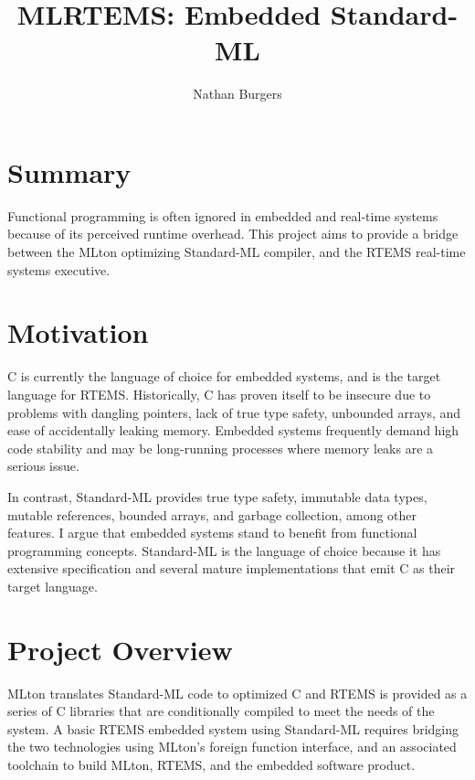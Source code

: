 \documentclass[12pt]{article}
\title{MLRTEMS: Embedded Standard-ML}
\author{Nathan Burgers}
\begin{document}
\maketitle

\section{Summary}
Functional programming is often ignored in embedded and real-time systems because of its perceived runtime overhead. This project aims to provide a bridge between the MLton optimizing Standard-ML compiler, and the RTEMS real-time systems executive.

\section{Motivation}
C is currently the language of choice for embedded systems, and is the target language for RTEMS. Historically, C has proven itself to be insecure due to problems with dangling pointers, lack of true type safety, unbounded arrays, and ease of accidentally leaking memory. Embedded systems frequently demand high code stability and may be long-running processes where memory leaks are a serious issue.

In contrast, Standard-ML provides true type safety, immutable data types, mutable references, bounded arrays, and garbage collection, among other features. I argue that embedded systems stand to benefit from functional programming concepts. Standard-ML is the language of choice because it has extensive specification and several mature implementations that emit C as their target language.

\section{Project Overview}

MLton translates Standard-ML code to optimized C and RTEMS is provided as a series of C libraries that are conditionally compiled to meet the needs of the system. A basic RTEMS embedded system using Standard-ML requires bridging the two technologies using MLton's foreign function interface, and an associated toolchain to build MLton, RTEMS, and the embedded software product.
\end{document}

